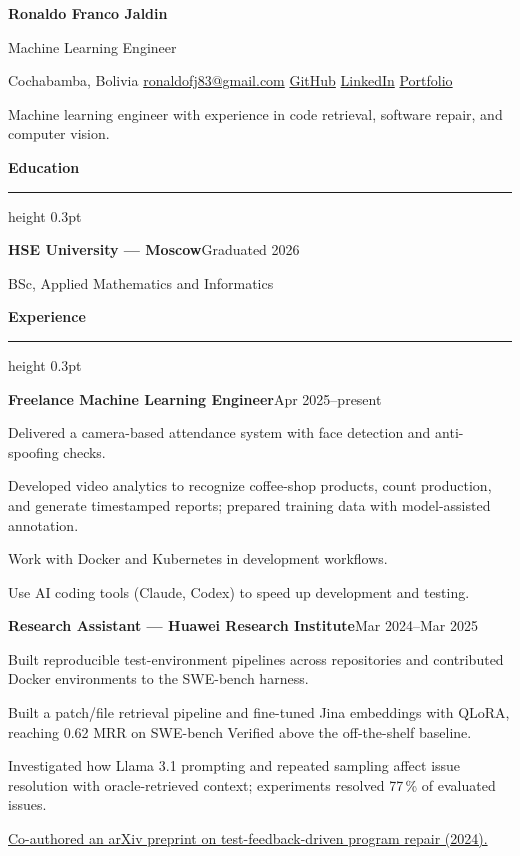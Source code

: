 \documentclass[11pt,a4paper]{article}
\newcommand{\sep}{\enspace\textperiodcentered\enspace}
\newcommand{\cvsection}[1]{%
  \par\addvspace{5pt}%
  {\bfseries #1\par}\nobreak
  \vspace{1.5pt}\hrule height 0.3pt\relax
  \nobreak\vspace{2pt}%
}
\newcommand{\cventry}[2]{%
  \par\noindent\textbf{#1}\hfill{\small #2}\par\nobreak
}
\newenvironment{cvitems}{%
  \begin{list}{\textbullet}{%
    \setlength{\leftmargin}{12pt}%
    \setlength{\rightmargin}{0pt}%
    \setlength{\labelwidth}{7pt}%
    \setlength{\labelsep}{5pt}%
    \setlength{\itemsep}{1.5pt}%
    \setlength{\parsep}{0pt}%
    \setlength{\topsep}{2pt}%
    \setlength{\partopsep}{0pt}%
  }%
}{\end{list}}
\begin{document}
\begin{center}
  {\Large\bfseries Ronaldo Franco Jaldin}\par
  \vspace{2pt}
  Machine Learning Engineer\par
  \vspace{3pt}
  {\small
    Cochabamba, Bolivia\sep
    \href{mailto:ronaldofj83@gmail.com}{ronaldofj83@gmail.com}\sep
    \href{https://github.com/mruniverse8}{GitHub}\sep
    \href{https://www.linkedin.com/in/ronaldo-franco-jaldin-2282311a3/}{LinkedIn}\sep
    \href{https://mruniverse8.github.io/}{Portfolio}\par
  }
\end{center}

Machine learning engineer with experience in code retrieval, software repair, and computer vision.

\cvsection{Education}
\cventry{HSE University --- Moscow}{Graduated 2026}
BSc, Applied Mathematics and Informatics

\cvsection{Experience}
\cventry{Freelance Machine Learning Engineer}{Apr 2025--present}
\begin{cvitems}
  \item Delivered a camera-based attendance system with face detection and anti-spoofing checks.
  \item Developed video analytics to recognize coffee-shop products, count production, and generate
    timestamped reports; prepared training data with model-assisted annotation.
  \item Work with Docker and Kubernetes in development workflows.
  \item Use AI coding tools (Claude, Codex) to speed up development and testing.
\end{cvitems}

\vspace{3pt}
\cventry{Research Assistant --- Huawei Research Institute}{Mar 2024--Mar 2025}
\begin{cvitems}
  \item Built reproducible test-environment pipelines across repositories and contributed Docker
    environments to the SWE-bench harness.
  \item Built a patch/file retrieval pipeline and fine-tuned Jina embeddings with QLoRA, reaching
    0.62 MRR on SWE-bench Verified above the off-the-shelf baseline.
  \item Investigated how Llama 3.1 prompting and repeated sampling affect issue resolution with
    oracle-retrieved context; experiments resolved 77\,\% of evaluated issues.
  \item \href{https://arxiv.org/abs/2410.04485}{Co-authored an arXiv preprint on test-feedback-driven program repair (2024).}
\end{cvitems}
\end{document}
